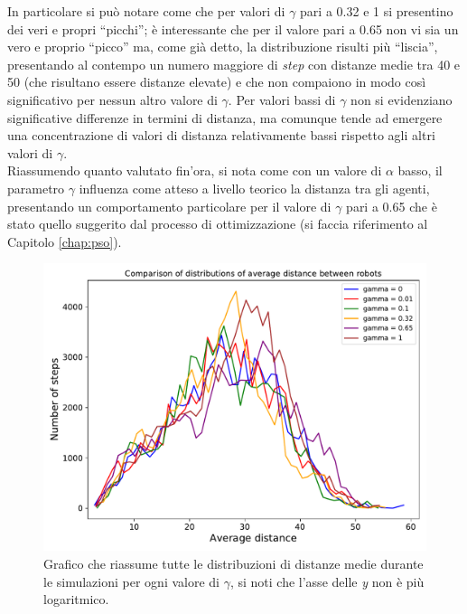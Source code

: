 In particolare si può notare come che per valori di $\gamma$ pari a 0.32 e 1 si presentino dei veri e propri “picchi”; è interessante che per il valore pari a 0.65 non vi sia un vero e proprio “picco” ma, come già detto, la distribuzione risulti più “liscia”, presentando al contempo un numero maggiore di \textit{step} con distanze medie tra 40 e 50 (che risultano essere distanze elevate) e che non compaiono in modo così significativo per nessun altro valore di $\gamma$.
Per valori bassi di $\gamma$ non si evidenziano significative differenze in termini di distanza, ma comunque tende ad emergere una concentrazione di valori di distanza relativamente bassi rispetto agli altri valori di $\gamma$.\\
Riassumendo quanto valutato fin'ora, si nota come con un valore di $\alpha$ basso, il parametro $\gamma$ influenza come atteso a livello teorico la distanza tra gli agenti, presentando un comportamento particolare per il valore di $\gamma$ pari a 0.65 che è stato quello suggerito dal processo di ottimizzazione (si faccia riferimento al Capitolo \ref{chap:pso}).
\begin{figure}
	\centering
	\includegraphics[width=0.9\linewidth]{images/gamma_results/low_alpha/comparison}
	\caption{Grafico che riassume tutte le distribuzioni di distanze medie durante le simulazioni per ogni valore di $\gamma$, si noti che l'asse delle \textit{y} non è più logaritmico.}
	\label{fig:gammaComparison}
\end{figure}

